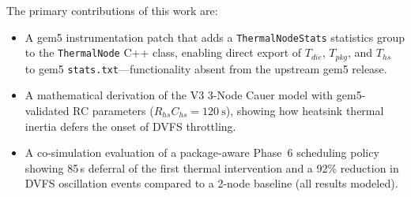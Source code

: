 The primary contributions of this work are:
\begin{itemize}
    \item A gem5 instrumentation patch that adds a \texttt{Thermal\-Node\-Stats} statistics group to the \texttt{Thermal\-Node} C++ class, enabling direct export of $T_{die}$, $T_{pkg}$, and $T_{hs}$ to gem5 \texttt{stats.txt}---functionality absent from the upstream gem5 release.
    \item A mathematical derivation of the V3 3-Node Cauer model with gem5-validated RC parameters ($R_{hs}C_{hs} = \SI{120}{\second}$), showing how heatsink thermal inertia defers the onset of DVFS throttling.
    \item A co-simulation evaluation of a package-aware Phase~6 scheduling policy showing 85\,s deferral of the first thermal intervention and a 92\% reduction in DVFS oscillation events compared to a 2-node baseline (all results modeled).
\end{itemize}
